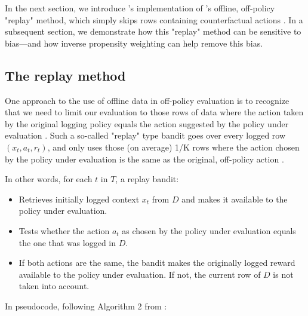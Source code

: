 \documentclass{jss}
\begin{document}
In the next section, we introduce 's implementation of \cite{Li2011}'s offline, off-policy "replay" method, which simply skips rows containing counterfactual actions \citep{Nicol2014}. In a subsequent section, we demonstrate how this "replay" method can be sensitive to bias---and how inverse propensity weighting can help remove this bias.

\subsection{The replay method} \label{offli}

One approach to the use of offline data in off-policy evaluation is to recognize that we need to limit our evaluation to those rows of data where the action taken by the original logging policy equals the action suggested by the policy under evaluation \citep{Li2012,Li2011}. Such a so-called "replay" type bandit goes over every logged row \((x_{t},a_{t},r_{t})\), and only uses those (on average) 1/K rows where the action chosen by the policy under evaluation is the same as the original, off-policy action \citep{Nicol2014}.

In other words, for each $t$ in $T$, a replay bandit:

\begin{itemize}
   \item{Retrieves initially logged context $x_{t}$ from $D$ and makes it available to the policy under evaluation.}
   \item{Tests whether the action $a_{t}$ as chosen by the policy under evaluation equals the one that was logged in $D$.}
   \item{If both actions are the same, the bandit makes the originally logged reward available to the policy under evaluation. If not, the current row of $D$ is not taken into account. }
\end{itemize}

In pseudocode, following Algorithm 2 from \cite{Li2011}:
\end{document}
